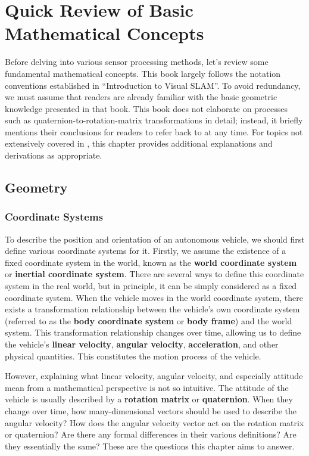 \thispagestyle{empty}

\chapter{Quick Review of Basic Mathematical Concepts}
\label{sec:math-basics}
\thispagestyle{empty}

Before delving into various sensor processing methods, let's review some fundamental mathematical concepts. This book largely follows the notation conventions established in ``Introduction to Visual SLAM''\cite{Gao2017}. To avoid redundancy, we must assume that readers are already familiar with the basic geometric knowledge presented in that book. This book does not elaborate on processes such as quaternion-to-rotation-matrix transformations in detail; instead, it briefly mentions their conclusions for readers to refer back to at any time. For topics not extensively covered in \cite{Gao2017}, this chapter provides additional explanations and derivations as appropriate.

\newpage


\section{Geometry}
\subsection{Coordinate Systems}

To describe the position and orientation of an autonomous vehicle, we should first define various coordinate systems for it. Firstly, we assume the existence of a fixed coordinate system in the world, known as the \textbf{world coordinate system} or \textbf{inertial coordinate system}. There are several ways to define this coordinate system in the real world, but in principle, it can be simply considered as a fixed coordinate system. When the vehicle moves in the world coordinate system, there exists a transformation relationship between the vehicle's own coordinate system (referred to as the \textbf{body coordinate system} or \textbf{body frame}) and the world system. This transformation relationship changes over time, allowing us to define the vehicle's \textbf{linear velocity}, \textbf{angular velocity}, \textbf{acceleration}, and other physical quantities. This constitutes the motion process of the vehicle.

However, explaining what linear velocity, angular velocity, and especially attitude mean from a mathematical perspective is not so intuitive. The attitude of the vehicle is usually described by a \textbf{rotation matrix} or \textbf{quaternion}. When they change over time, how many-dimensional vectors should be used to describe the angular velocity? How does the angular velocity vector act on the rotation matrix or quaternion? Are there any formal differences in their various definitions? Are they essentially the same? These are the questions this chapter aims to answer.

